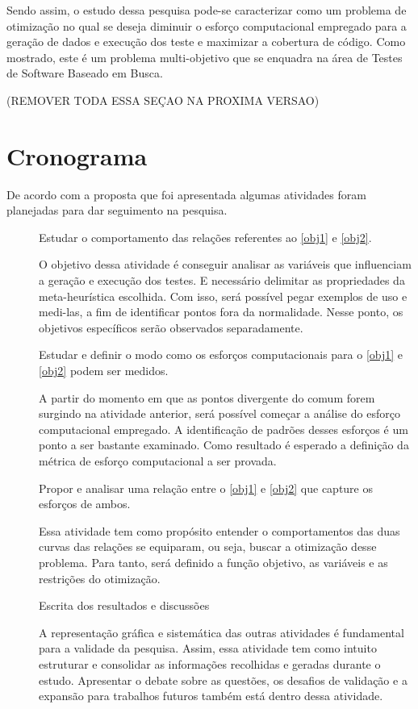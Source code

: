 Sendo assim,  o estudo dessa pesquisa pode-se caracterizar como um problema de otimização no qual se deseja diminuir o esforço computacional empregado para a geração de dados e execução dos teste e maximizar a cobertura de código. Como mostrado, este é um problema multi-objetivo que se enquadra na área de Testes de Software Baseado em Busca.


(REMOVER TODA ESSA SEÇAO NA PROXIMA VERSAO)
\section{Cronograma}

De acordo com a proposta que foi apresentada algumas atividades foram planejadas para dar seguimento na pesquisa.

\begin{description}
\item[] Estudar o comportamento das relações referentes ao \ref{obj1} e \ref{obj2}.

O objetivo dessa atividade é conseguir analisar as variáveis que influenciam a geração e execução dos testes. E necessário delimitar as propriedades da meta-heurística escolhida. Com isso, será possível pegar exemplos de uso e medi-las, a fim de identificar pontos fora da normalidade. Nesse ponto, os objetivos específicos serão observados separadamente.

\item[] Estudar e definir o modo como os esforços computacionais para o \ref{obj1} e \ref{obj2} podem ser medidos.

A partir do momento em que as pontos divergente do comum forem surgindo na atividade anterior, será possível começar a análise do esforço computacional empregado. A identificação de padrões desses esforços é um ponto a ser bastante examinado. Como resultado é esperado a definição da métrica de esforço computacional a ser provada.

\item[] Propor e analisar uma relação entre o \ref{obj1} e \ref{obj2} que capture os esforços de ambos.

Essa atividade tem como propósito entender o comportamentos das duas curvas das relações se equiparam, ou seja, buscar a otimização desse problema. Para tanto, será definido a função objetivo, as variáveis e as restrições do otimização. 

\item[] Escrita dos resultados e discussões

A representação gráfica e sistemática das outras atividades é fundamental para a validade da pesquisa. Assim, essa atividade tem como intuito estruturar e consolidar as informações recolhidas e geradas durante o estudo. Apresentar o debate sobre as questões, os desafios de validação e a expansão para trabalhos futuros também está dentro dessa atividade.

\end{description}

